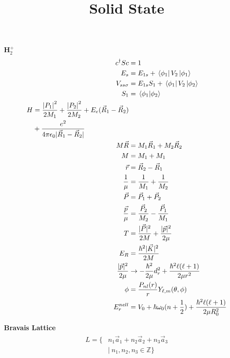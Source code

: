 \documentclass[12pt]{article}
\title{\vspace{-2em}Solid State}
\date{}
\begin{document}
\maketitle

\vspace{-4em}
\begin{multicols}{2}

\noindent
\textbf{H$_2^+$}
\begin{align}
  c^{\dagger}Sc &= 1\\
  E_s &= E_{1s} + \bra*{\phi_1}V_2\ket*{\phi_1}\\
  V_{ss\sigma} &= E_{1s}S_1 + \bra*{\phi_1}V_2\ket*{\phi_2}\\
  S_1 &= \braket*{\phi_1}{\phi_2}\\
  \begin{split}
    H &= \frac{{\lvert P_1\rvert}^2}{2M_1} + \frac{{\lvert P_2\rvert}^2}{2M_2} + E_e(\vec{R}_1 - \vec{R}_2)\\
    &+ \frac{e^2}{4\pi\epsilon_0\lvert \vec{R}_1 - \vec{R}_2\rvert}
  \end{split}\\
  M\vec{R} &= M_1\vec{R}_1 + M_2\vec{R}_2\\
  M &= M_1 + M_1\\
  \vec{r} &= \vec{R}_2 - \vec{R}_1\\
  \frac{1}{\mu} &= \frac{1}{M_1} + \frac{1}{M_2}\\
  \vec{P} &= \vec{P}_1 + \vec{P}_2\\
  \frac{\vec{p}}{\mu} &= \frac{\vec{P}_2}{M_2} - \frac{\vec{P}_1}{M_1}\\
  T &= \frac{\lvert \vec{P}\rvert^2}{2M} + \frac{\lvert \vec{p}\rvert^2}{2\mu}\\
  E_R &= \frac{\hbar^2\lvert \vec{K} \rvert^2}{2M}\\
  \frac{\lvert \vec{p} \rvert^2}{2\mu} &\rightarrow -\frac{\hbar^2}{2\mu}d_r^2 + \frac{\hbar^2\ell(\ell+1)}{2\mu r^2}\\
  \phi &= \frac{P_{nl}(r)}{r}Y_{\ell,m}(\theta,\phi)\\
  E_r^{nell} &= V_0 + \hbar\omega_0(n + \frac{1}{2})+\frac{\hbar^2\ell(\ell + 1)}{2\mu R_0^2}
\end{align}

\noindent
\textbf{Bravais Lattice}
\begin{align}
  \begin{split}
    L {}= \{&n_1 \vec{a}_1 + n_2 \vec{a}_2 + n_3 \vec{a}_3\\
    &\lvert \ n_1, n_2, n_3 \in \mathbb{Z}\}
  \end{split}
\end{align}


\end{multicols}
\end{document}
